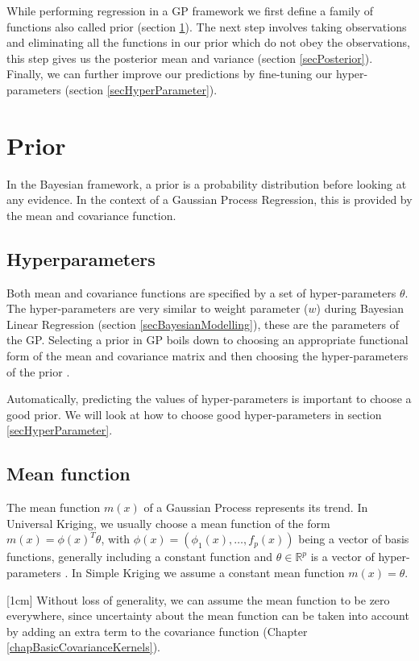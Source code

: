 While performing regression in a GP framework we first define a family of functions also called prior (section \ref{secPrior}). The next step involves taking observations and eliminating all the functions in our prior which do not obey the observations, this step gives us the posterior mean and variance (section \ref{secPosterior}). Finally, we can further improve our predictions by fine-tuning our hyper-parameters (section \ref{secHyperParameter}).

\section{Prior} \label{secPrior}
In the Bayesian framework, a prior is a probability distribution before looking at any evidence. In the context of a Gaussian Process Regression, this is provided by the mean and covariance function. 

\subsection{Hyperparameters}
Both mean and covariance functions are specified by a set of hyper-parameters \(\theta\). The hyper-parameters are very similar to weight parameter (\(w\)) during Bayesian Linear Regression (section \ref{secBayesianModelling}), these are the parameters of the GP. Selecting a prior in GP boils down to choosing an appropriate functional form of the mean and covariance matrix and then choosing the hyper-parameters of the prior \cite{duvenaud2013structure}. 

Automatically, predicting the values of hyper-parameters is important to choose a good prior. We will look at how to choose good hyper-parameters in section \ref{secHyperParameter}. 

\subsection{Mean function}\label{subSecCH2MeanFunction}
The mean function \(m(x)\) of a Gaussian Process represents its trend. In Universal Kriging, we usually choose a mean function of the form \(m(x) = \phi(x)^{T}\theta\), with \(\phi(x) = (\phi_{1}(x), \ldots , f_{p}(x))\) being a vector of basis functions, generally including a constant function and \(\theta \in \mathbb{R}^{p}\) is a vector of hyper-parameters \cite{matheron1963principles}. In Simple Kriging we assume a constant mean function \(m(x) = \theta\).

[1cm]
Without loss of generality, we can assume the mean function to be zero everywhere, since uncertainty about the mean function can be taken into account by adding an extra term to the covariance function (Chapter \ref{chapBasicCovarianceKernels}).  

